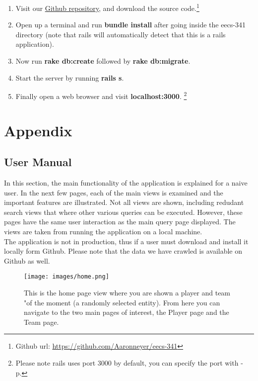 \documentclass[12pt,letterpaper]{article}
\begin{document}
\begin{enumerate}

\item Visit our \href{http://www.github.com/aaronneyer/eecs-341}{Github repository}, and download the source code.\footnote{Github url: \url{https://github.com/Aaronneyer/eecs-341}}

\item Open up a terminal and run {\bf bundle install} after going inside the eecs-341 directory (note that rails will automatically detect that this is a rails application).

\item Now run {\bf rake db:create } followed by {\bf rake db:migrate}.

\item Start the server by running {\bf rails s}.

\item Finally open a web browser and visit {\bf localhost:3000}. \footnote{Please note rails uses port 3000 by default, you can specify the port with -p.}

\end{enumerate}

\clearpage\null
\section{Appendix}


\subsection{User Manual}
In this section, the main functionality of the application is explained for a naive user. In the next few pages, each of the main views is examined and the important features are illustrated. Not all views are shown, including redudant search views that where other various queries can be executed. However, these pages have the same user interaction as the main query page displayed. The views are taken from running the application on a local machine. \\
The application is not in production, thus if a user must download and install it locally form Github. Please note that the data we have crawled is available on Github as well.
\clearpage\null
\begin{figure}
\centering
\texttt{[image: images/home.png]}
\caption{This is the home page view where you are shown a player and team "of the moment (a randomly selected entity). From here you can navigate to the two main pages of interest, the Player page and the Team page.}
\label{fig:home}
\end{figure}
\end{document}
